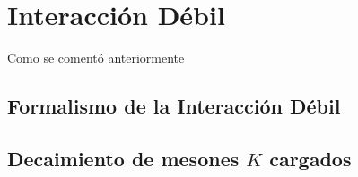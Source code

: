 \chapter{Interacción Débil}\label{cap:weak_int}

Como se comentó anteriormente


\section{Formalismo de la Interacción Débil}\label{cap:formalism}
\vspace{5mm}

\section{Decaimiento de mesones $K$ cargados}
\label{charged_kaon_decay}
\vspace{5mm}